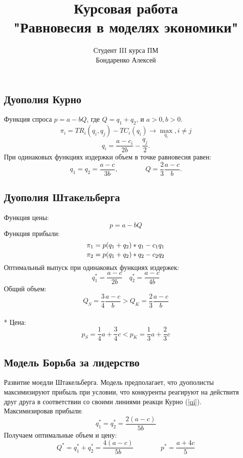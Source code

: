 \documentclass {beamer}
\title{Курсовая работа\\ "Равновесия в моделях экономики"}
\author {Студент III курса ПМ \\ Бондаренко Алексей}
\date{}
\begin{document}
\begin{frame}
\maketitle
\end{frame}

\begin{frame}
\section{Дуополия Курно}
Функция спроса $p=a-bQ$, где $Q=q_1+q_2$, и $a>0,b>0.$ $$\pi_i=TR_i(q_i,q_j)-TC_i(q_i)\to \max_{q_i} ,i\ne j$$
\begin{equation} \label{qi}  q_i = \frac{a-c_i}{2b}-\frac {q_j}{2}.  \end{equation}
При одинаковых функциях издержки объем в точке равновесия равен: $$q_1 =q_2 = \frac {a-c}{3b}, \qquad\qquad Q=\frac{2}{3}\frac{a-c}{b}.$$
\end{frame}

\begin{frame}
\section{Дуополия Штакельберга}
Функция цены: $$p=a-bQ$$ Функция прибыли: $${\pi_1 = p(q_1+q_2)*q_1-c_1 q_1 \atop \pi_2 = p(q_1+q_2)*q_2-c_2 q_2 }$$ Оптимальный выпуск при одинаковых функциях издержек:$$q^*_1=\frac{a-c}{2b} \quad q^*_2=\frac{a-c}{4b}$$ Общий объем: $$Q_S=\frac{3}{4}\frac{a-c}{b}>Q_K=\frac{2}{3}\frac{a-c}{b} $$\\* Цена:$$ p_S=\frac{1}{4}a+\frac{3}{4}c<p_K=\frac{1}{3}a+\frac{2}{3}c$$
\end{frame}

\begin{frame}
\section{Модель Борьба за лидерство}
Развитие моедли Штакельберга. Модель предполагает, что дуополисты максимизируют прибыль при условии, что конкуренты реагируют на действитя друг друга в соответствии со своими линиями реакци Курно (\ref{qi}). Максимизировав прибыли: $$q_1^* = q_2^* = \frac{2(a-c)}{5b} $$ Получаем оптимальные объем и цену: $$ Q^*=q_1^*+q_2^* = \frac{4(a-c)}{5b} \qquad \qquad p^*=\frac{a+4c}{5}$$
\end{frame}
\end{document}

